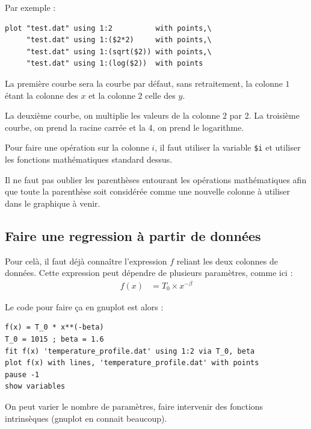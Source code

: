\documentclass[a4paper,twoside]{article}
\begin{document}
Par exemple : 
\begin{verbatim}
plot "test.dat" using 1:2          with points,\
     "test.dat" using 1:($2*2)     with points,\
     "test.dat" using 1:(sqrt($2)) with points,\
     "test.dat" using 1:(log($2))  with points
\end{verbatim}
La première courbe sera la courbe par défaut, sans retraitement, la colonne $1$ étant la colonne des $x$ et la colonne $2$ celle des $y$.

La deuxième courbe, on multiplie les valeurs de la colonne $2$ par 2. La troisième courbe, on prend la racine carrée et la 4\ieme, on prend le logarithme. 

Pour faire une opération sur la colonne $i$, il faut utiliser la variable \texttt{\$i} et utiliser les fonctions mathématiques standard dessus.

\begin{attention}
Il ne faut pas oublier les parenthèses entourant les opérations mathématiques afin que toute la parenthèse soit considérée comme une nouvelle colonne à utiliser dans le graphique à venir.
\end{attention}

\subsection{Faire une regression à partir de données}
Pour celà, il faut déjà connaître l'expression $f$ reliant les deux colonnes de données. Cette expression peut dépendre de plusieurs paramètres, comme ici :
\begin{align}
f(x) &= T_0 \times x^{-\beta}
\end{align}

Le code pour faire ça en gnuplot est alors :
\begin{verbatim}
f(x) = T_0 * x**(-beta)
T_0 = 1015 ; beta = 1.6
fit f(x) 'temperature_profile.dat' using 1:2 via T_0, beta
plot f(x) with lines, 'temperature_profile.dat' with points
pause -1
show variables
\end{verbatim}

On peut varier le nombre de paramètres, faire intervenir des fonctions intrinsèques (gnuplot en connait beaucoup). 
\end{document}
